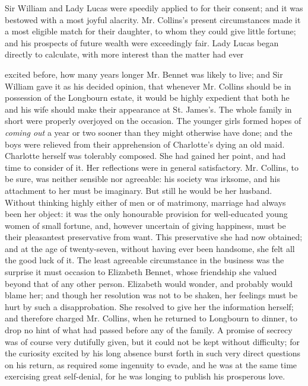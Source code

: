 Sir William and Lady Lucas were speedily applied to for their consent; and it was bestowed with a most joyful alacrity. Mr. Collins's present circumstances made it a most eligible match for their daughter, to whom they could give little fortune; and his prospects of future wealth were exceedingly fair. Lady Lucas began directly to calculate, with more interest than the matter had ever



excited before, how many years longer Mr. Bennet was likely to live; and Sir William gave it as his decided opinion, that whenever Mr. Collins should be in possession of the Longbourn estate, it would be highly expedient that both he and his wife should make their appearance at St. James's. The whole family in short were properly overjoyed on the occasion. The younger girls formed hopes of \textit{coming out} a year or two sooner than they might otherwise have done; and the boys were relieved from their apprehension of Charlotte's dying an old maid. Charlotte herself was tolerably composed. She had gained her point, and had time to consider of it. Her reflections were in general satisfactory. Mr. Collins, to be sure, was neither sensible nor agreeable: his society was irksome, and his attachment to her must be imaginary. But still he would be her husband. Without thinking highly either of men or of matrimony, marriage had always been her object: it was the only honourable provision for well-educated young women of small fortune, and, however uncertain of giving happiness, must be their pleasantest preservative from want. This preservative she had now obtained; and at the age of twenty-seven, without having ever been handsome, she felt all the good luck of it. The least agreeable circumstance in the business was the surprise it must occasion to Elizabeth Bennet, whose friendship she valued beyond that of any other person. Elizabeth would wonder, and probably would blame her; and though her resolution was not to be shaken, her feelings must be hurt by such a disapprobation. She resolved to give her the information herself; and therefore charged Mr. Collins, when he returned to Longbourn to dinner, to drop no hint of what had passed before any of the family. A promise of secrecy was of course very dutifully given, but it could not be kept without difficulty; for the curiosity excited by his long absence burst forth in such very direct questions on his return, as required some ingenuity to evade, and he was at the same time exercising great self-denial, for he was longing to publish his prosperous love.

